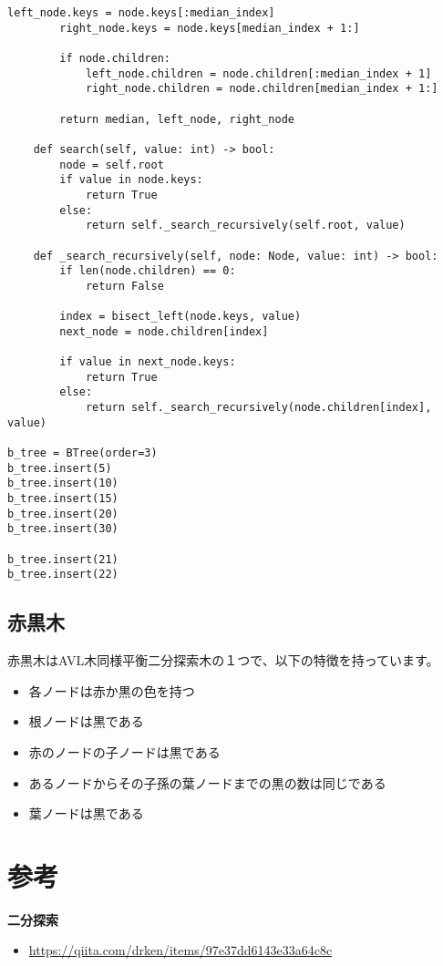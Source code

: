 \begin{lstlisting}[caption=B木の実装, label=btree, frame=TRBL, label={btree}]
        left_node.keys = node.keys[:median_index]
        right_node.keys = node.keys[median_index + 1:]

        if node.children:
            left_node.children = node.children[:median_index + 1]
            right_node.children = node.children[median_index + 1:]

        return median, left_node, right_node

    def search(self, value: int) -> bool:
        node = self.root
        if value in node.keys:
            return True
        else:
            return self._search_recursively(self.root, value)
    
    def _search_recursively(self, node: Node, value: int) -> bool:
        if len(node.children) == 0:
            return False
        
        index = bisect_left(node.keys, value)
        next_node = node.children[index]
        
        if value in next_node.keys:
            return True
        else:
            return self._search_recursively(node.children[index], value)

b_tree = BTree(order=3)
b_tree.insert(5)
b_tree.insert(10)
b_tree.insert(15)
b_tree.insert(20)
b_tree.insert(30)

b_tree.insert(21)
b_tree.insert(22)
\end{lstlisting}

\newpage

\subsection{赤黒木}
赤黒木はAVL木同様平衡二分探索木の１つで、以下の特徴を持っています。

\begin{itemize}
  \item 各ノードは赤か黒の色を持つ
  \item 根ノードは黒である
  \item 赤のノードの子ノードは黒である
  \item あるノードからその子孫の葉ノードまでの黒の数は同じである
  \item 葉ノードは黒である
\end{itemize}


\section{参考}
\textbf{二分探索}

\begin{itemize}
  \item \url{https://qiita.com/drken/items/97e37dd6143e33a64c8c}
\end{itemize}


